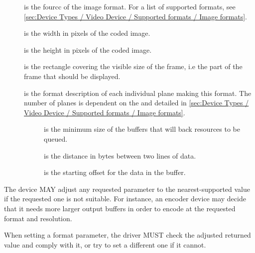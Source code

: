 \begin{description}
\item[]
is the fourcc of the image format. For a list of supported formats, see
\ref{sec:Device Types / Video Device / Supported formats / Image formats}.
\item[]
is the width in pixels of the coded image.
\item[]
is the height in pixels of the coded image.
\item[]
is the rectangle covering the visible size of the frame, i.e the part of
the frame that should be displayed.
\item[]
is the format description of each individual plane making this format.
The number of planes is dependent on the  and detailed in
\ref{sec:Device Types / Video Device / Supported formats / Image formats}.

\begin{description}
\item[]
is the minimum size of the buffers that will back resources to be
queued.
\item[]
is the distance in bytes between two lines of data.
\item[]
is the starting offset for the data in the buffer.
\end{description}
\end{description}


The device MAY adjust any requested parameter to the nearest-supported
value if the requested one is not suitable. For instance, an encoder
device may decide that it needs more larger output buffers in order to
encode at the requested format and resolution.


When setting a format parameter, the driver MUST check the adjusted
returned value and comply with it, or try to set a different one if it
cannot.

